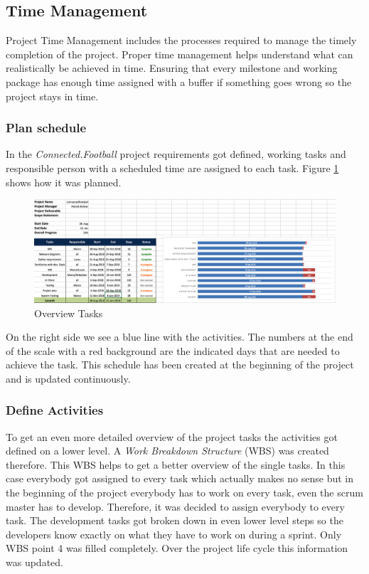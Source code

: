 \subsection{Time Management}
\label{ssec:time_management}

Project Time Management includes the processes required to manage the timely completion of the project. Proper time management helps understand what can realistically be achieved in time. Ensuring that every milestone and working package has enough time assigned with a buffer if something goes wrong so the project stays in time.

\subsubsection{Plan schedule}
\label{sssec:plan_schedule}

In the \textit{Connected.Football} project requirements got defined, working tasks and responsible person with a scheduled time are assigned to each task. Figure \ref{fig:overview_tasks} shows how it was planned.

\begin{figure}[H]
  \includegraphics[width=\linewidth]{images/diagrams/timemangement.png}
  \caption{Overview Tasks}
  \label{fig:overview_tasks}
\end{figure}

On the right side we see a blue line with the activities. The numbers at the end of the scale with a red background are the indicated days that are needed to achieve the task. This schedule has been created at the beginning of the project and is updated continuously. 

\subsubsection{Define Activities}
\label{ssec:define_activities}

To get an even more detailed overview of the project tasks the activities got defined on a lower level. A \textit{Work Breakdown Structure} (WBS) was created therefore. This WBS helps to get a better overview of the single tasks. In this case everybody got assigned to every task which actually makes no sense but in the beginning of the project everybody has to work on every task, even the scrum master has to develop. Therefore, it was decided to assign everybody to every task. The development tasks got broken down in even lower level steps so the developers know exactly on what they have to work on during a sprint. Only WBS point 4 was filled completely. Over the project life cycle this information was updated.

